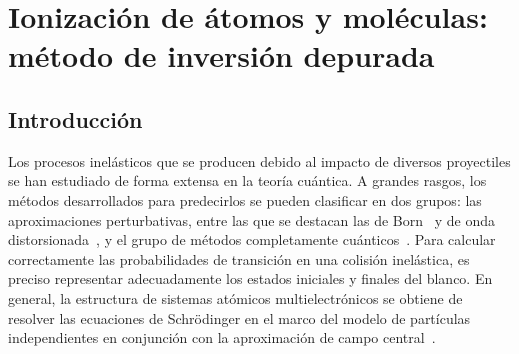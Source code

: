 \chapter{Ionización de átomos y moléculas: método de inversión depurada}
\label{chap:iondim}

\section{Introducción}

Los procesos inelásticos que se producen debido al impacto de diversos 
proyectiles se 
han estudiado de forma extensa en la teoría cuántica. A grandes rasgos, 
los métodos desarrollados para predecirlos se pueden clasificar en dos 
grupos: las aproximaciones perturbativas, entre las que se destacan las 
de Born~\cite{Bates:62,McDowell:61} y de onda 
distorsionada~\cite{Crothers:10,Rivarola:87}, y el grupo de métodos 
completamente cuánticos~\cite{Pindzola:07,Burke:11,Bray:17,
Zatsarinny:04,McCurdy:04}. 
Para calcular correctamente las probabilidades de transición en una 
colisión inelástica, es preciso representar adecuadamente los estados 
iniciales y finales del blanco. En general, la estructura de sistemas 
atómicos multielectrónicos se obtiene de resolver las ecuaciones de 
Schr\"odinger en el marco del modelo de partículas independientes en 
conjunción con la aproximación de campo central~\cite{Bransden:03,
Cowan:81}. 
\begin{comment}
Para calcular correctamente las probabilidades de transición en una 
colisión inelástica, es preciso representar adecuadamente los estados 
iniciales y finales del blanco. En general, la resolución de las 
ecuaciones de Schr\"odinger de sistemas multielectrónicos atómicos 
implementa el modelo de partículas independientes en conjunción con la 
aproximación de campo central~\cite{Bransden:03,Cowan:81}. 

La descripción de la estructura electrónica de sistemas moleculares 
constituye un desafío desde el punto de vista teórico debido a su 
geometría multicéntrica. Sin embargo, se han propuesto diversas 
aproximaciones para tal fin~\cite{Helgaker:00,Schaefer:04}. 

En el marco de la teoría cuántica, los procesos colisionales de átomos 
y moléculas simples debido al impacto de diversos proyectiles se ha 
estudiado de forma extensa. A grandes rasgos, los métodos desarrollados
para predecirlos se puden clasificar en dos grupos: las aproximaciones 
perturbativas, entre las que se destacan las de Born~\cite{Bates:62,
McDowell:61} y de onda distorcionada~\cite{Crothers:10,Rivarola:87}, y 
el grupo de métodos no perturbativos, con técnicas tales como los de 
acoplamiento cercano~\cite{Pindzola:07,Burke:11,Bray:17,Zatsarinny:04,
McCurdy:04}. 
\end{comment}

